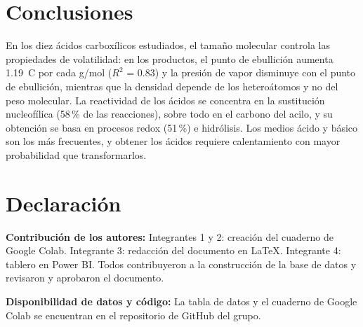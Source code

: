\documentclass[twoside,twocolumn,10pt]{article}
\begin{document}
\section{Conclusiones}
\fontsize{12}{14}\selectfont
En los diez ácidos carboxílicos estudiados, el tamaño molecular controla las propiedades de volatilidad: en los productos, el punto de ebullición aumenta 1.19~\textdegree C por cada g/mol ($R^2$ = 0.83) y la presión de vapor disminuye con el punto de ebullición, mientras que la densidad depende de los heteroátomos y no del peso molecular. 
La reactividad de los ácidos se concentra en la sustitución nucleofílica (58\,\% de las reacciones), sobre todo en el carbono del acilo, y su obtención se basa en procesos redox (51\,\%) e hidrólisis.
Los medios ácido y básico son los más frecuentes, y obtener los ácidos requiere calentamiento con mayor probabilidad que transformarlos.


\section{Declaración}
\fontsize{11}{13}\selectfont


\textbf{Contribución de los autores:} Integrantes 1 y 2: creación del cuaderno de Google Colab. Integrante 3: redacción del documento en \LaTeX. Integrante 4: tablero en Power BI. Todos contribuyeron a la construcción de la base de datos y revisaron y aprobaron el documento.

\textbf{Disponibilidad de datos y código:} La tabla de datos y el cuaderno de Google Colab se encuentran en el repositorio de GitHub del grupo.

\printbibliography
\end{document}
